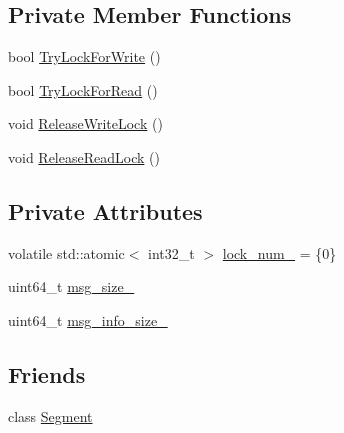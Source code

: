 \subsection*{Private Member Functions}
\begin{DoxyCompactItemize}
\item 
bool \hyperlink{classapollo_1_1cyber_1_1transport_1_1Block_a79e0b61814fdd0ba55734d0017b06ec9}{Try\-Lock\-For\-Write} ()
\item 
bool \hyperlink{classapollo_1_1cyber_1_1transport_1_1Block_ad4236c6e29aad911ce47530bf8e04b5d}{Try\-Lock\-For\-Read} ()
\item 
void \hyperlink{classapollo_1_1cyber_1_1transport_1_1Block_a65798da9b41997e646e49e32258ba6cd}{Release\-Write\-Lock} ()
\item 
void \hyperlink{classapollo_1_1cyber_1_1transport_1_1Block_aacbf18bfaa062a1e9be733c8342af79b}{Release\-Read\-Lock} ()
\end{DoxyCompactItemize}
\subsection*{Private Attributes}
\begin{DoxyCompactItemize}
\item 
volatile std\-::atomic$<$ int32\-\_\-t $>$ \hyperlink{classapollo_1_1cyber_1_1transport_1_1Block_a8bf07ade84f828523975c578bf354021}{lock\-\_\-num\-\_\-} = \{0\}
\item 
uint64\-\_\-t \hyperlink{classapollo_1_1cyber_1_1transport_1_1Block_a2626f093e96f3b5697753e4b6f561507}{msg\-\_\-size\-\_\-}
\item 
uint64\-\_\-t \hyperlink{classapollo_1_1cyber_1_1transport_1_1Block_a7ee8f352a21a677cb194ca109056a762}{msg\-\_\-info\-\_\-size\-\_\-}
\end{DoxyCompactItemize}
\subsection*{Friends}
\begin{DoxyCompactItemize}
\item 
class \hyperlink{classapollo_1_1cyber_1_1transport_1_1Block_a3686fc7786dbff5d4f068e021ebacdca}{Segment}
\end{DoxyCompactItemize}


